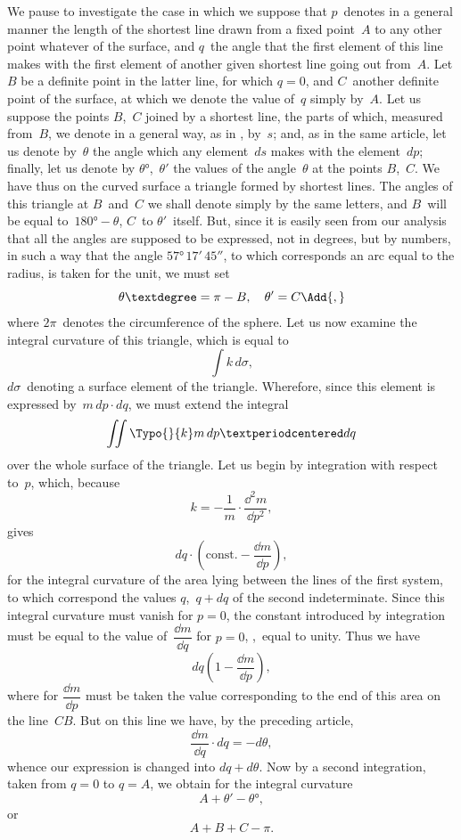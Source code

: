 We pause to investigate the case in which we suppose that $p$~denotes in a general
manner the length of the shortest line drawn from a fixed point~$A$ to any other
point whatever of the surface, and $q$~the angle that the first element of this line
makes with the first element of another given shortest line going out from~$A$. Let
$B$ be a definite point in the latter line, for which $q = 0$, and $C$~another definite point
of the surface, at which we denote the value of~$q$ simply by~$A$. Let us suppose the
points $B$,~$C$ joined by a shortest line, the parts of which, measured from~$B$, we denote
in a general way, as in , by~$s$; and, as in the same article, let us denote by~$\theta$
the angle which any element~$ds$ makes with the element~$dp$; finally, let us denote
by $\theta°$,~$\theta'$ the values of the angle~$\theta$ at the points $B$,~$C$. We have thus on the curved
surface a triangle formed by shortest lines. The angles of this triangle at $B$~and~$C$
we shall denote simply by the same letters, and $B$~will be equal to~$180° - \theta$, $C$~to $\theta'$~itself.
But, since it is easily seen from our analysis that all the angles are supposed
to be expressed, not in degrees, but by numbers, in such a way that the angle $57°\, 17'\, 45''$,
to which corresponds an arc equal to the radius, is taken for the unit, we must set
\[
\theta° = \pi - B,\quad \theta' = C\Add{,}
\]
where $2\pi$~denotes the circumference of the sphere. Let us now examine the integral
curvature of this triangle, which is equal to
\[
\int k\, d\sigma,
\]
$d\sigma$~denoting a surface element of the triangle. Wherefore, since this element is expressed
by~$m\, dp·dq$, we must extend the integral
\[
\iint \Typo{}{k}m\, dp·dq
\]
over the whole surface of the triangle. Let us begin by integration with respect to~$p$,
which, because
\[
k = -\frac{1}{m}·\frac{\dd^{2} m}{\dd p^{2}},
\]
gives
\[
dq·\left(\text{const.} - \frac{\dd m}{\dd p}\right),
\]
for the integral curvature of the area lying between the lines of the first system, to
which correspond the values $q$,~$q + dq$ of the second indeterminate. Since this integral
curvature must vanish for $p = 0$, the constant introduced by integration must be
equal to the value of~$\dfrac{\dd m}{\dd q}$ for $p = 0$, \ie,~equal to unity. Thus we have
\[
dq\left(1 - \frac{\dd m}{\dd p}\right),
\]
where for $\dfrac{\dd m}{\dd p}$ must be taken the value corresponding to the end of this area on the
line~$CB$. But on this line we have, by the preceding article,
\[
\frac{\dd m}{\dd q}·dq = -d\theta,
\]
whence our expression is changed into $dq + d\theta$. Now by a second integration, taken
from $q = 0$ to $q = A$, we obtain for the integral curvature
\[
A + \theta'- \theta°,
\]
or
\[
A + B + C - \pi.
\]

